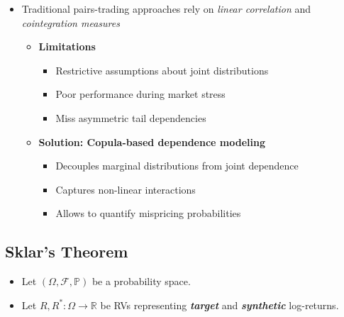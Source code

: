 \documentclass[
  letterpaper,
  DIV=11,
  numbers=noendperiod]{scrartcl}
\providecommand{\tightlist}{%
  \setlength{\itemsep}{0pt}\setlength{\parskip}{0pt}}\usepackage{longtable,booktabs,array}
\begin{document}
\begin{itemize}
\tightlist
\item
  Traditional pairs-trading approaches rely on \emph{linear correlation}
  and \emph{cointegration measures}

  \begin{itemize}
  \tightlist
  \item
    {\textbf{Limitations}}

    \begin{itemize}
    \tightlist
    \item
      Restrictive assumptions about joint distributions
    \item
      Poor performance during market stress
    \item
      Miss asymmetric tail dependencies
    \end{itemize}
  \end{itemize}

  \begin{itemize}
  \tightlist
  \item
    {\textbf{Solution: Copula-based dependence modeling}}

    \begin{itemize}
    \tightlist
    \item
      Decouples marginal distributions from joint dependence
    \item
      Captures non-linear interactions
    \item
      Allows to quantify mispricing probabilities
    \end{itemize}
  \end{itemize}
\end{itemize}

\subsection{Sklar's Theorem}\label{sklars-theorem}

\begin{itemize}
\tightlist
\item
  Let \((\Omega, \mathcal{F}, \mathbb{P})\) be a probability space.
\end{itemize}

\begin{itemize}
\tightlist
\item
  Let \(R, R^*: \Omega \to \mathbb{R}\) be RVs representing
  \textbf{\emph{target}} and \textbf{\emph{synthetic}} log-returns.
\end{itemize}
\end{document}

